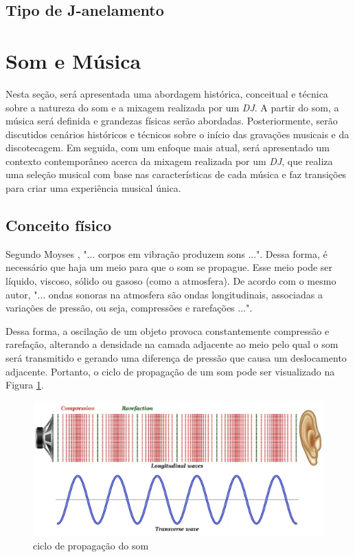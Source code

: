 \subsection[short]{Tipo de J-anelamento}

\section{Som e Música}
Nesta seção, será apresentada uma abordagem histórica, conceitual e técnica sobre a natureza do som e a mixagem realizada por um \textit{DJ}. A partir do som, a música será definida e grandezas físicas serão abordadas. Posteriormente, serão discutidos cenários históricos e técnicos sobre o início das gravações musicais e da discotecagem. Em seguida, com um enfoque mais atual, será apresentado um contexto contemporâneo acerca da mixagem realizada por um \textit{DJ}, que realiza uma seleção musical com base nas características de cada música e faz transições para criar uma experiência musical única.

\subsection{Conceito físico}
Segundo Moyses \cite{moyses}, "... corpos em vibração produzem sons ...". Dessa forma, é necessário que haja um meio para que o som se propague. Esse meio pode ser líquido, viscoso, sólido ou gasoso (como a atmosfera). De acordo com o mesmo autor, "... ondas sonoras na atmosfera são ondas longitudinais, associadas a variações de pressão, ou seja, compressões e rarefações ...". \par Dessa forma, a oscilação de um objeto provoca constantemente compressão e rarefação, alterando a densidade na camada adjacente ao meio pelo qual o som será transmitido e gerando uma diferença de pressão que causa um deslocamento adjacente. Portanto, o ciclo de propagação de um som pode ser visualizado na Figura \ref{fig07}.

\begin{figure}[h]
	\centering
    \includegraphics[scale=0.6]{figuras/fig07.png}
	\caption{ciclo de propagação do som \cite{shutterstock}}
	\label{fig07}
\end{figure}

